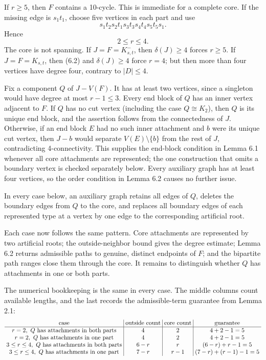 \documentclass[
  11pt]{article}
\begin{document}
If \(r\ge5\), then \(F\) contains a 10-cycle. This is immediate for a
complete core. If the missing edge is \(s_1t_1\), choose five vertices
in each part and use \[
 s_1t_2s_2t_1s_3t_3s_4t_4s_5t_5s_1.
\] Hence \[
 2\le r\le4. \tag{6.2}
\] The core is not spanning. If \(J=F=K_{s,t}^-\), then
\(\delta(J)\ge4\) forces \(r\ge5\). If \(J=F=K_{s,t}\), then (6.2) and
\(\delta(J)\ge4\) force \(r=4\); but then more than four vertices have
degree four, contrary to \(|D|\le4\).

Fix a component \(Q\) of \(J-V(F)\). It has at least two vertices, since
a singleton would have degree at most \(r-1\le3\). Every end block of
\(Q\) has an inner vertex adjacent to \(F\). If \(Q\) has no cut vertex
(including the case \(Q\cong K_2\)), then \(Q\) is its unique end block,
and the assertion follows from the connectedness of \(J\). Otherwise, if
an end block \(E\) had no such inner attachment and \(b\) were its
unique cut vertex, then \(J-b\) would separate \(V(E)\setminus\{b\}\)
from the rest of \(J\), contradicting 4-connectivity. This supplies the
end-block condition in Lemma 6.1 whenever all core attachments are
represented; the one construction that omits a boundary vertex is
checked separately below. Every auxiliary graph has at least four
vertices, so the order condition in Lemma 6.2 causes no further issue.

In every case below, an auxiliary graph retains all edges of \(Q\),
deletes the boundary edges from \(Q\) to the core, and replaces all
boundary edges of each represented type at a vertex by one edge to the
corresponding artificial root.

Each case now follows the same pattern. Core attachments are represented
by two artificial roots; the outside-neighbor bound gives the degree
estimate; Lemma 6.2 returns admissible paths to genuine, distinct
endpoints of \(F\); and the bipartite path ranges close them through the
core. It remains to distinguish whether \(Q\) has attachments in one or
both parts.

The numerical bookkeeping is the same in every case. The middle columns
count available lengths, and the last records the admissible-term
guarantee from Lemma 2.1: \[
\setlength{\arraycolsep}{3pt}
\begin{array}{c|c|c|c}
\text{case}
&\text{outside count}
&\text{core count}
&\text{guarantee}\\ \hline
r=2,\ Q\text{ has attachments in both parts}
&4&2&4+2-1=5\\
r=2,\ Q\text{ has attachments in one part}
&4&2&4+2-1=5\\
3\le r\le4,\ Q\text{ has attachments in both parts}
&6-r&r&(6-r)+r-1=5\\
3\le r\le4,\ Q\text{ has attachments in one part}
&7-r&r-1&(7-r)+(r-1)-1=5
\end{array}
\]
\end{document}
